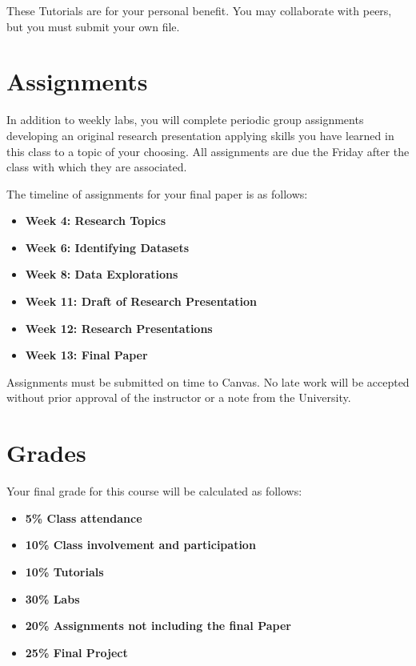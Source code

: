 These Tutorials are for your personal benefit. You may collaborate with peers, but you must submit your own file.

\section{Assignments} 

In addition to weekly labs, you will complete periodic group assignments developing an original research presentation applying skills you have learned in this class to a topic of your choosing. All assignments are due the Friday after the class with which they are associated. 

The timeline of assignments for your final paper is as follows:

\begin{itemize}
\item \textbf{Week 4: Research Topics}
\item \textbf{Week 6: Identifying Datasets}
\item \textbf{Week 8: Data Explorations}
\item \textbf{Week 11: Draft of Research Presentation}
\item \textbf{Week 12: Research Presentations}
\item \textbf{Week 13: Final Paper}
\end{itemize}

Assignments must be submitted on time to Canvas. No late work will be accepted without prior approval of the instructor or a note from the University.


\section{Grades}

Your final grade for this course will be calculated as follows:

\begin{itemize}
	\item \textbf{5\% Class attendance}
	\item \textbf{10\% Class involvement and participation}
	\item \textbf{10\% Tutorials}
	\item \textbf{30\% Labs}
	\item \textbf{20\% Assignments not including the final Paper}
	\item \textbf{25\% Final Project}
\end{itemize}


